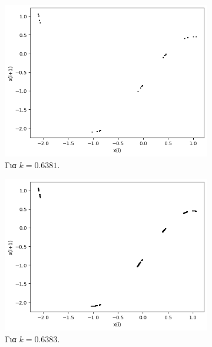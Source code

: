 \begin{figure}[h!]
	\centering
	\begin{subfigure}[b]{0.4\textwidth}
		\centering
		\includegraphics[width=\textwidth]{LateX images/graphs q21/g9}
		\caption{Για $k=0.6381$.}
		\label{f:k109}
	\end{subfigure}
	\hfill
	\begin{subfigure}[b]{0.4\textwidth}
		\centering
		\includegraphics[width=\textwidth]{LateX images/graphs q21/g10}
		\caption{Για $k=0.6383$.}
		\label{f:k110}
	\end{subfigure}
	\hfill
	\begin{subfigure}[b]{0.4\textwidth}
		\centering

\end{subfigure}
\end{figure}
